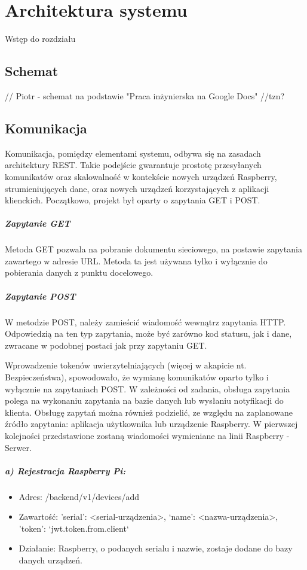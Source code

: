 \chapter{Architektura systemu}

Wstęp do rozdziału

\section*{Schemat}

// Piotr - schemat na podstawie "Praca inżynierska na Google Docs"
//tzn?

\section*{Komunikacja}

Komunikacja, pomiędzy elementami systemu, odbywa się na zasadach architektury REST. Takie podejście gwarantuje prostotę przesyłanych komunikatów oraz skalowalność w kontekście nowych urządzeń Raspberry, strumieniujących dane, oraz nowych urządzeń korzystających z aplikacji klienckich. Początkowo, projekt był oparty o zapytania GET i POST.  

\paragraph{Zapytanie GET}
Metoda GET pozwala na pobranie dokumentu sieciowego, na postawie zapytania zawartego w adresie URL. Metoda ta jest używana tylko i wyłącznie do pobierania danych z punktu docelowego. 

\paragraph{Zapytanie POST}
W metodzie POST, należy zamieścić wiadomość wewnątrz zapytania HTTP. Odpowiedzią na ten typ zapytania, może być zarówno kod statusu, jak i dane, zwracane w podobnej postaci jak przy zapytaniu GET.

Wprowadzenie tokenów uwierzytelniających (więcej w akapicie nt. Bezpieczeństwa), spowodowało, że wymianę komunikatów oparto tylko i wyłącznie na zapytaniach POST. 
W zależności od zadania, obsługa zapytania polega na wykonaniu zapytania na bazie danych lub wysłaniu notyfikacji do klienta.
Obsługę zapytań można również podzielić, ze względu na zaplanowane źródło zapytania: aplikacja użytkownika lub urządzenie Raspberry.
W pierwszej kolejności przedstawione zostaną wiadomości wymieniane na linii Raspberry - Serwer.
\paragraph{a) Rejestracja Raspberry Pi:}
\begin{itemize}
\item Adres: /backend/v1/devices/add
\item Zawartość: {'serial': <serial-urządzenia>, ‘name’: <nazwa-urządzenia>, 'token': `jwt.token.from.client`}
\item Działanie: Raspberry, o podanych serialu i nazwie, zostaje dodane do bazy danych urządzeń.
\end{itemize}
